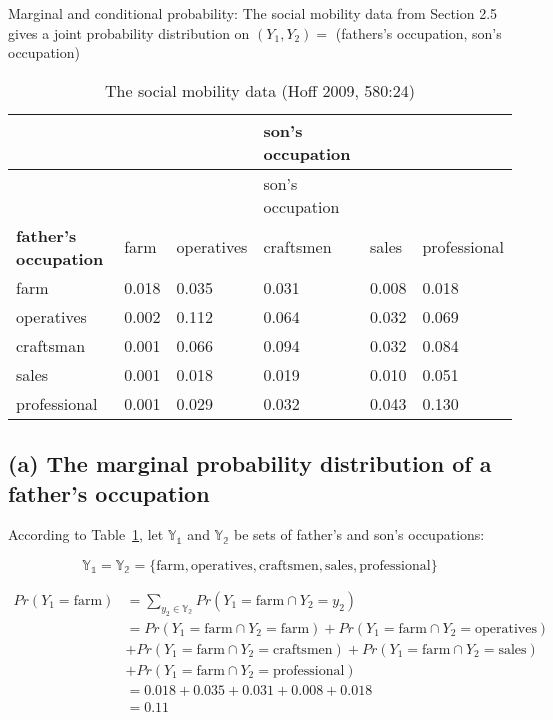 \documentclass[
  letterpaper,
  DIV=11,
  numbers=noendperiod]{scrreprt}
\begin{document}
Marginal and conditional probability: The social mobility data from
Section 2.5 gives a joint probability distribution on \((Y_1, Y_2)=\)
(fathers's occupation, son's occupation)

\hypertarget{tbl-social}{}
\begin{longtable}[]{@{}llllll@{}}
\caption{\label{tbl-social}The social mobility data (Hoff 2009,
580:24)}\tabularnewline
\toprule()
& & & son's occupation & & \\
\midrule()
\endfirsthead
\toprule()
& & & son's occupation & & \\
\midrule()
\endhead
\textbf{father's occupation} & farm & operatives & craftsmen & sales &
professional \\
farm & 0.018 & 0.035 & 0.031 & 0.008 & 0.018 \\
operatives & 0.002 & 0.112 & 0.064 & 0.032 & 0.069 \\
craftsman & 0.001 & 0.066 & 0.094 & 0.032 & 0.084 \\
sales & 0.001 & 0.018 & 0.019 & 0.010 & 0.051 \\
professional & 0.001 & 0.029 & 0.032 & 0.043 & 0.130 \\
\bottomrule()
\end{longtable}

\hypertarget{a-the-marginal-probability-distribution-of-a-fathers-occupation}{%
\subsection{(a) The marginal probability distribution of a father's
occupation}\label{a-the-marginal-probability-distribution-of-a-fathers-occupation}}

According to Table~\ref{tbl-social}, let \(\mathbb{Y_1}\) and
\(\mathbb{Y_2}\) be sets of father's and son's occupations:

\[\mathbb{Y_1} = \mathbb{Y_2} = \{\text{farm},\text{operatives},\text{craftsmen},\text{sales},\text{professional}\}\]

\[
\begin{aligned}
    Pr(Y_1 = \text{farm}) &= \sum_{y_2\in\mathbb{Y_2}}Pr(Y_1= \text{farm} \cap Y_2=y_2)\\
    &= Pr(Y_1= \text{farm} \cap Y_2=\text{farm}) + Pr(Y_1= \text{farm} \cap Y_2=\text{operatives}) \\
    & +Pr(Y_1= \text{farm} \cap Y_2=\text{craftsmen}) + Pr(Y_1= \text{farm} \cap Y_2=\text{sales}) \\ 
    & +Pr(Y_1= \text{farm} \cap Y_2=\text{professional})\\
    &= 0.018 + 0.035 + 0.031 + 0.008 + 0.018\\ 
    &= 0.11
\end{aligned}
\]
\end{document}
